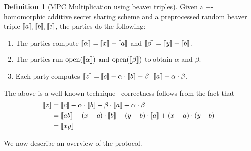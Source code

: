 \documentclass[11pt]{report}
\theoremstyle{definition}
\newtheorem{definition}{Definition}[section]
\theoremstyle{plain}
\begin{document}
\begin{definition}[MPC Multiplication using beaver triples]\label{def:beaver-multiplication}
  Given a $+$-homomorphic additive secret sharing scheme and a preprocessed random beaver triple $\llbracket a \rrbracket, \llbracket b \rrbracket, \llbracket c \rrbracket $, the parties do the following:
  \begin{enumerate}
    \item The parties compute $ \llbracket \alpha \rrbracket = \llbracket x \rrbracket - \llbracket a \rrbracket $ and $ \llbracket \beta \rrbracket = \llbracket y \rrbracket - \llbracket b \rrbracket $.
    \item The parties run $ \text{open}(\llbracket \alpha \rrbracket) $ and $ \text{open}(\llbracket \beta \rrbracket) $ to obtain $ \alpha $ and $ \beta $.
    \item Each party computes $ \llbracket z \rrbracket = \llbracket c \rrbracket - \alpha \cdot \llbracket b \rrbracket - \beta \cdot \llbracket a \rrbracket + \alpha \cdot \beta $.
  \end{enumerate}

  The above is a well-known technique~\cite{beaver1992efficient} correctness follows from the fact that
  \begin{align*}
    \llbracket z \rrbracket & = \llbracket c \rrbracket - \alpha \cdot \llbracket b \rrbracket - \beta \cdot \llbracket a \rrbracket + \alpha \cdot \beta        \\
           & = \llbracket ab \rrbracket - (x - a) \cdot \llbracket b \rrbracket - (y - b) \cdot \llbracket a \rrbracket + (x - a) \cdot (y - b) \\
           & = \llbracket xy \rrbracket
  \end{align*}
\end{definition}

We now describe an overview of the protocol.
\end{document}
